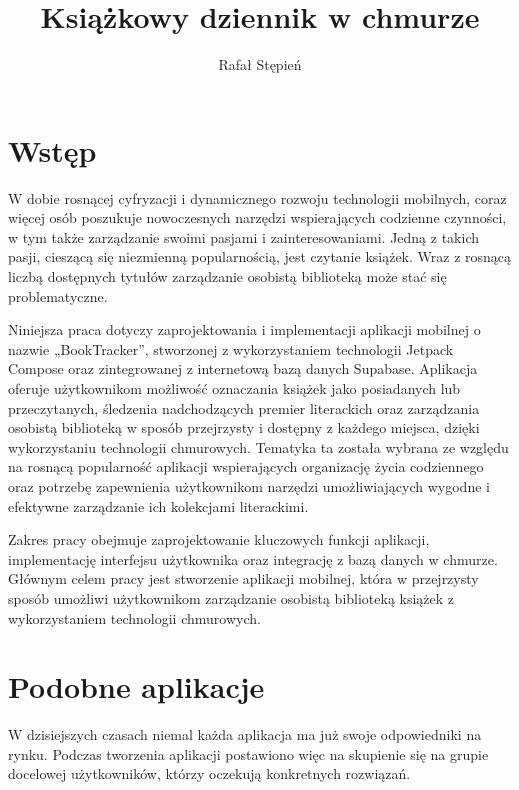 \documentclass[12pt,twoside]{article}
\author{Rafał Stępień}
\title{Książkowy dziennik w chmurze}
\begin{document}
\maketitle

\blankpage

\tableofcontents

\clearpage
\blankpage

\section{Wstęp}
W dobie rosnącej cyfryzacji i dynamicznego rozwoju technologii mobilnych, coraz więcej osób poszukuje
nowoczesnych narzędzi wspierających codzienne czynności, w tym także zarządzanie swoimi pasjami i 
zainteresowaniami. Jedną z takich pasji, cieszącą się niezmienną popularnością, jest czytanie książek.
Wraz z rosnącą liczbą dostępnych tytułów zarządzanie osobistą biblioteką może stać się problematyczne.

Niniejsza praca dotyczy zaprojektowania i implementacji aplikacji mobilnej o nazwie 
„BookTracker”, stworzonej z wykorzystaniem technologii Jetpack Compose 
oraz zintegrowanej z internetową bazą danych Supabase. Aplikacja oferuje użytkownikom możliwość 
oznaczania książek jako posiadanych lub przeczytanych, śledzenia nadchodzących premier 
literackich oraz zarządzania osobistą biblioteką w sposób przejrzysty i dostępny z każdego 
miejsca, dzięki wykorzystaniu technologii chmurowych. Tematyka ta została wybrana ze względu 
na rosnącą popularność aplikacji wspierających organizację życia codziennego oraz potrzebę 
zapewnienia użytkownikom narzędzi umożliwiających wygodne i efektywne zarządzanie ich kolekcjami 
literackimi.

Zakres pracy obejmuje zaprojektowanie kluczowych funkcji aplikacji, implementację interfejsu 
użytkownika oraz integrację z bazą danych w chmurze. Głównym celem pracy jest stworzenie aplikacji mobilnej, 
która w przejrzysty sposób umożliwi użytkownikom zarządzanie osobistą biblioteką książek z 
wykorzystaniem technologii chmurowych.

\clearpage

\section{Podobne aplikacje}

W dzisiejszych czasach niemal każda aplikacja ma już swoje odpowiedniki na rynku. Podczas 
tworzenia aplikacji postawiono więc na skupienie się na grupie docelowej użytkowników, którzy
oczekują konkretnych rozwiązań.
\end{document}
